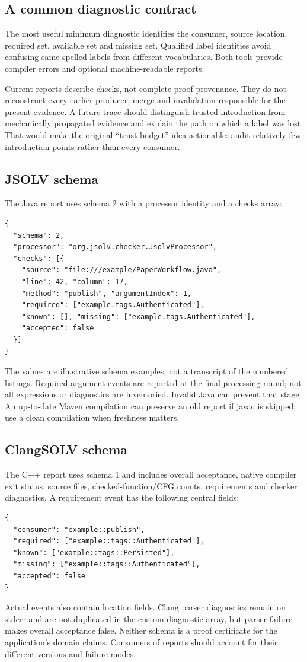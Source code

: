 \documentclass[11pt]{article}
\begin{document}
\subsection{A common diagnostic contract}
The most useful minimum diagnostic identifies the consumer, source location,
required set, available set and missing set. Qualified label identities avoid
confusing same-spelled labels from different vocabularies. Both tools provide
compiler errors and optional machine-readable reports.

Current reports describe checks, not complete proof provenance. They do not
reconstruct every earlier producer, merge and invalidation responsible for
the present evidence. A future trace should distinguish trusted introduction
from mechanically propagated evidence and explain the path on which a label
was lost. That would make the original ``trust budget'' idea actionable:
audit relatively few introduction points rather than every consumer.

\subsection{JSOLV schema}
The Java report uses schema 2 with a processor identity and a checks array:
\begin{lstlisting}
{
  "schema": 2,
  "processor": "org.jsolv.checker.JsolvProcessor",
  "checks": [{
    "source": "file:///example/PaperWorkflow.java",
    "line": 42, "column": 17,
    "method": "publish", "argumentIndex": 1,
    "required": ["example.tags.Authenticated"],
    "known": [], "missing": ["example.tags.Authenticated"],
    "accepted": false
  }]
}
\end{lstlisting}
The values are illustrative schema examples, not a transcript of the numbered
listings. Required-argument events are reported at the final processing round;
not all expressions or diagnostics are inventoried. Invalid Java can prevent
that stage. An up-to-date Maven compilation can preserve an old report if
javac is skipped; use a clean compilation when freshness matters.

\subsection{ClangSOLV schema}
The C++ report uses schema 1 and includes overall acceptance, native compiler
exit status, source files, checked-function/CFG counts, requirements and
checker diagnostics. A requirement event has the following central fields:
\begin{lstlisting}
{
  "consumer": "example::publish",
  "required": ["example::tags::Authenticated"],
  "known": ["example::tags::Persisted"],
  "missing": ["example::tags::Authenticated"],
  "accepted": false
}
\end{lstlisting}
Actual events also contain location fields. Clang parser diagnostics remain
on stderr and are not duplicated in the custom diagnostic array, but parser
failure makes overall acceptance false. Neither schema is a proof certificate
for the application's domain claims. Consumers of reports should account
for their different versions and failure modes.
\end{document}
